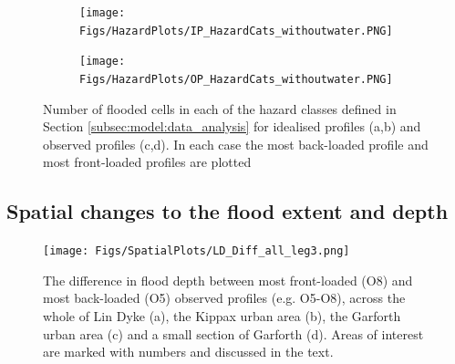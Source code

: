 \documentclass[APA,Times2COL]{WileyNJDv5}
\begin{document}
\begin{figure}[!t] 
\begin{subfigure}[H]{\linewidth}
\texttt{[image: Figs/HazardPlots/IP\_HazardCats\_withoutwater.PNG]}
\end{subfigure}
\begin{subfigure}[H]{\linewidth}
\texttt{[image: Figs/HazardPlots/OP\_HazardCats\_withoutwater.PNG]}
\end{subfigure}
 \caption{Number of flooded cells in each of the hazard classes defined in Section \ref{subsec:model:data_analysis} for idealised profiles (a,b) and observed profiles (c,d). In each case the most back-loaded profile and most front-loaded profiles are plotted}\label{fig:hazard_plots} 
\end{figure}


\subsection{Spatial changes to the flood extent and depth}\label{subsec:model}
\begin{figure}[h!]
  \centering
 \texttt{[image: Figs/SpatialPlots/LD\_Diff\_all\_leg3.png]}
  \caption{The difference in flood depth between most front-loaded (O8) and most back-loaded (O5) observed profiles (e.g. O5-O8), across the whole of Lin Dyke (a), the Kippax urban area (b), the Garforth urban area (c) and a small section of Garforth (d). Areas of interest are marked with numbers and discussed in the text. }\label{fig:flooded_area_spatial_diff} 
\end{figure}
\end{document}

